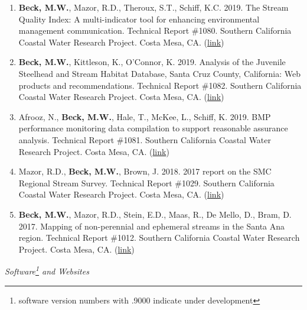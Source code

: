 \documentclass[letterpaper,12pt]{article}
\begin{document}
\begin{enumerate}
\item \textbf{Beck, M.W.}, Mazor, R.D., Theroux, S.T., Schiff, K.C. 2019. The Stream Quality Index: A multi-indicator tool for enhancing environmental management communication. Technical Report \#1080. Southern California Coastal Water Research Project. Costa Mesa, CA. ({\footnotesize\href{http://ftp.sccwrp.org/pub/download/DOCUMENTS/TechnicalReports/1080_StreamQualityIndex.pdf}{link}})

\item \textbf{Beck, M.W.}, Kittleson, K., O'Connor, K. 2019. Analysis of the Juvenile Steelhead and Stream Habitat Database, Santa Cruz County, California: Web products and recommendations. Technical Report \#1082. Southern California Coastal Water Research Project. Costa Mesa, CA. ({\footnotesize\href{http://ftp.sccwrp.org/pub/download/DOCUMENTS/TechnicalReports/1082_SantaCruzSteelheads.pdf}{link}})

\item Afrooz, N., \textbf{Beck, M.W.}, Hale, T., McKee, L., Schiff, K. 2019. BMP performance monitoring data compilation to support reasonable assurance analysis. Technical Report \#1081. Southern California Coastal Water Research Project. Costa Mesa, CA. ({\footnotesize\href{http://ftp.sccwrp.org/pub/download/DOCUMENTS/TechnicalReports/1081_BMPPerformanceRAA.pdf}{link}})

\item Mazor, R.D., \textbf{Beck, M.W.}, Brown, J. 2018. 2017 report on the SMC Regional Stream Survey. Technical Report \#1029. Southern California Coastal Water Research Project. Costa Mesa, CA. ({\footnotesize\href{http://ftp.sccwrp.org/pub/download/DOCUMENTS/TechnicalReports/1029_2017SMCReport.pdf}{link}})

\item \textbf{Beck, M.W.}, Mazor, R.D., Stein, E.D., Maas, R., De Mello, D., Bram, D. 2017. Mapping of non-perennial and ephemeral streams in the Santa Ana region. Technical Report \#1012. Southern California Coastal Water Research Project. Costa Mesa, CA. ({\footnotesize\href{http://ftp.sccwrp.org/pub/download/DOCUMENTS/TechnicalReports/1012_MappingStreamsSantaAna.pdf}{link}})

\end{enumerate}

\vspace{\baselineskip} 
\centerline{\large{\textit{Software\footnote{software version numbers with .9000 indicate under development} and Websites}}}
\end{document}
